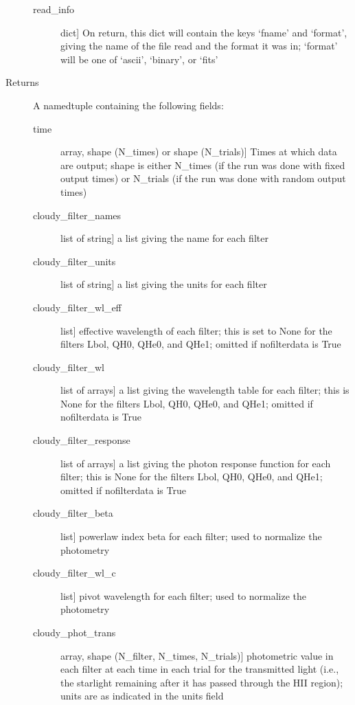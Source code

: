 \documentclass[letterpaper,10pt,english]{sphinxmanual}
\begin{document}
\begin{fulllineitems}
\begin{description}
\begin{description}
\item[{read\_info}] \leavevmode{[}dict{]}
On return, this dict will contain the keys `fname' and
`format', giving the name of the file read and the format it
was in; `format' will be one of `ascii', `binary', or `fits'

\end{description}

\item[{Returns}] \leavevmode
A namedtuple containing the following fields:
\begin{description}
\item[{time}] \leavevmode{[}array, shape (N\_times) or shape (N\_trials){]}
Times at which data are output; shape is either N\_times (if
the run was done with fixed output times) or N\_trials (if
the run was done with random output times)

\item[{cloudy\_filter\_names}] \leavevmode{[}list of string{]}
a list giving the name for each filter

\item[{cloudy\_filter\_units}] \leavevmode{[}list of string{]}
a list giving the units for each filter

\item[{cloudy\_filter\_wl\_eff}] \leavevmode{[}list{]}
effective wavelength of each filter; this is set to None for the
filters Lbol, QH0, QHe0, and QHe1; omitted if nofilterdata is
True

\item[{cloudy\_filter\_wl}] \leavevmode{[}list of arrays{]}
a list giving the wavelength table for each filter; this is
None for the filters Lbol, QH0, QHe0, and QHe1; omitted if
nofilterdata is True

\item[{cloudy\_filter\_response}] \leavevmode{[}list of arrays{]}
a list giving the photon response function for each filter;
this is None for the filters Lbol, QH0, QHe0, and QHe1; omitted
if nofilterdata is True

\item[{cloudy\_filter\_beta}] \leavevmode{[}list{]}
powerlaw index beta for each filter; used to normalize the
photometry

\item[{cloudy\_filter\_wl\_c}] \leavevmode{[}list{]}
pivot wavelength for each filter; used to normalize the photometry

\item[{cloudy\_phot\_trans}] \leavevmode{[}array, shape (N\_filter, N\_times, N\_trials){]}
photometric value in each filter at each time in each trial for
the transmitted light (i.e., the starlight remaining after it
has passed through the HII region); units are as indicated in
the units field


\end{description}
\end{description}
\end{fulllineitems}
\end{document}
